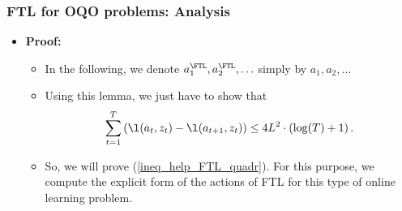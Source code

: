 \documentclass[11pt,compress,t,notes=noshow, xcolor=table]{beamer}
\begin{document}
\begin{frame} 
	\frametitle{FTL for OQO problems: Analysis}
	\small
	\begin{itemize}		
		
		\item \textbf{Proof:}
		\begin{itemize}
				\item In the following, we denote  $a_1^{\FTL}, a_2^{\FTL}, \ldots$  simply by  $a_1, a_2, \ldots$  	
				\pause
				
				\pause	
				 \item  Using this lemma, we just have to show that
				\begin{align} \label{ineq_help_FTL_quadr}
						\sum\limits_{t=1}^T \left(\l(a_t,z_t) - \l(a_{t+1},z_t)  \right) \leq 4L^2 \cdot \left(\log(T) + 1 \right).
					\end{align}
				\pause			
				 \item So, we will prove (\ref{ineq_help_FTL_quadr}).
				For this purpose, we compute the explicit form of the actions of FTL for this type of online learning problem.
			\end{itemize}
	\end{itemize}
\end{frame}
%
%
\end{document}
